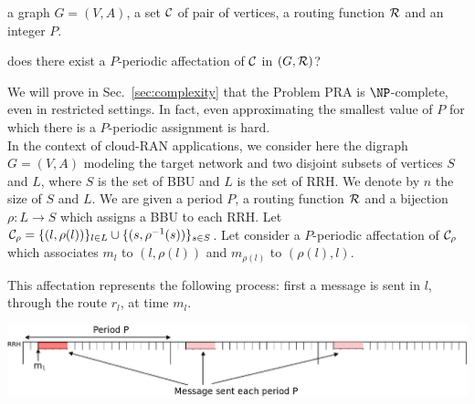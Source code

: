 \documentclass[a4paper,10pt]{article}
\begin{document}

       a graph $G=(V,A)$, a set $\cal C$ of pair of vertices, a routing function $\cal R$ and an integer $P$.

       does there exist a $P$-periodic affectation of $\cal C$ in $(G,{\cal R})$?

      We will prove in Sec.~\ref{sec:complexity} that the Problem PRA is $\NP$-complete, even in restricted settings.
      In fact, even approximating the smallest value of $P$ for which there is a $P$-periodic assignment is hard.\\
% 

      
      In the context of cloud-RAN applications, we consider here the digraph $G=(V,A)$ modeling the target network 
      and two disjoint subsets of vertices $S$ and $L$, where $S$ is the set of BBU and $L$ is the set of RRH. 
      We denote by $n$ the size of $S$ and $L$. We are given a period $P$, a routing function ${\cal R}$ and a bijection $\rho:L\rightarrow S$ which assigns a BBU to each RRH. Let ${\cal C}_{\rho} = \{(l,\rho(l))\}_{l \in L} \cup \{(s,\rho^{-1}(s))\}_{s \in S}$. Let consider a $P$-periodic affectation of ${\cal C}_{\rho}$ which associates $m_l$ to 
      $(l,\rho(l))$ and $m_{\rho(l)}$ to $(\rho(l),l)$.  
      
      This affectation represents the following process: first a message is sent in $l$, through the route $r_l$, at time $m_l$.
      
      \begin{center}
      \includegraphics[scale=0.2]{rrh.jpeg}
      \end{center}
      
\end{document}
